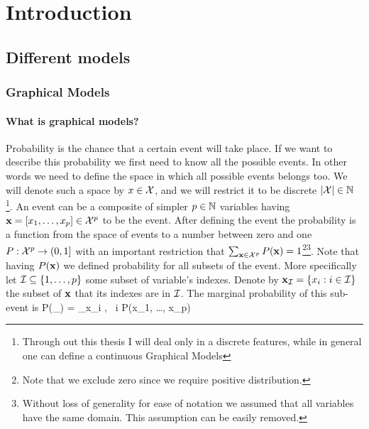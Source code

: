 
\chapter{Introduction} %

\label{intro} %


\newcommand{\keyword}[1]{\textbf{#1}}
\newcommand{\tabhead}[1]{\textbf{#1}}
\newcommand{\code}[1]{\texttt{#1}}
\newcommand{\file}[1]{\texttt{\bfseries#1}}
\newcommand{\option}[1]{\texttt{\itshape#1}}

\section{Different models}
\subsection{Graphical Models}
\subsubsection{What is graphical models?}
Probability is the chance that a certain event will take place.
If we want to describe this probability we first need to know all the possible events.
In other words we need to define the space in which all possible events belongs too.
We will denote such a space by $x \in {\cal X}$, and we will restrict it to be discrete $ |{\cal X}| \in \mathbb{N}$
\footnote{Through out this thesis I will deal only in a discrete features, while in general one can define a continuous Graphical Models}.
An event can be a composite of simpler $p \in \mathbb{N}$ variables having ${\bf x} = [x_1, \ldots, x_{p}] \in {\cal X}^p$ to be the event.
After defining the event the probability is  a function from the space of events to a number between zero and one $P:{\cal X}^{p} \to (0,1]$ with an important restriction that $\sum_{{\bf x} \in {\cal X}^{p}} P({\bf x}) = 1$\footnote{Note that we exclude zero since we require positive distribution.}\footnote{Without loss of generality for ease of notation we assumed that all variables have the same domain. This assumption can be easily removed.}.
Note that having $P({\bf x})$ we defined probability for all subsets of the event.
More specifically let $ {\cal I} \subseteq \{1, \ldots,p\}$ some subset of variable's indexes. Denote by ${\bf x}_{{\cal I}} = \{x_i : i \in {\cal I}\}$ the subset of ${\bf x}$ that its indexes are in ${\cal I}$.  
The marginal probability of this sub-event is 
\be
\label{eq:MAR}
P(\xx_{\cI}) = \sum_{x_i \in \cX, \forall\ i \in [1,\ldots p] \setminus \cI} P(x_1, \ldots, x_p)
\ee


